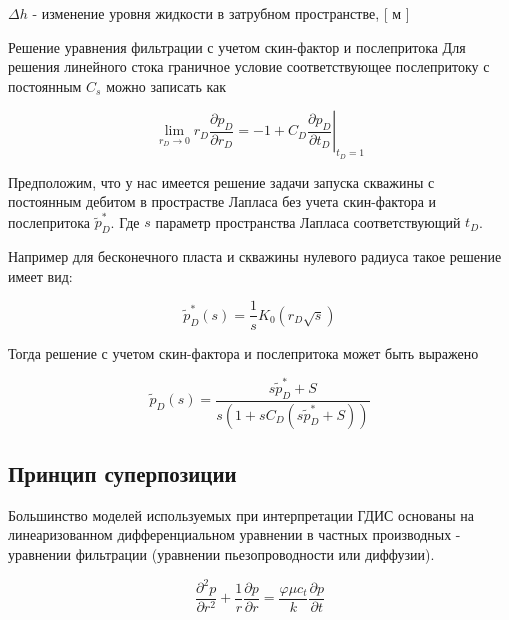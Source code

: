 $ {\Delta h}$ - изменение уровня жидкости в затрубном пространстве, [ м ]

Решение уравнения фильтрации с учетом скин-фактор и послепритока
Для решения линейного стока граничное условие соответствующее послепритоку с постоянным $C_s$ можно записать как

$$ \lim_{r_D \to 0} {r_D \frac{\partial p_D}{\partial r_D}} = -1 + \left. C_D \frac{\partial p_D}{\partial t_D} \right|_{t_D=1}$$

Предположим, что у нас имеется решение задачи запуска скважины с постоянным дебитом в прострастве Лапласа без учета скин-фактора и послепритока $\tilde{p}_D^{*}$. Где $s$ параметр пространства Лапласа соответствующий $t_D$.

Например для бесконечного пласта и скважины нулевого радиуса такое решение имеет вид: 

$$\tilde{p}_D^*(s) = \frac{1}{s} K_0 \left( r_D \sqrt s  \right) $$

Тогда решение с учетом скин-фактора и послепритока может быть выражено 

$$\tilde{p}_D(s) = \frac{s \tilde{p}_D^* + S}{s \left( 1+s C_D \left( s \tilde{p}_D^* + S \right)  \right)}   $$



%
%
%
%

\subsection{Принцип суперпозиции}

Большинство моделей используемых при интерпретации ГДИС основаны на линеаризованном дифференциальном уравнении в частных производных - уравнении фильтрации (уравнении пьезопроводности или диффузии).

$$ \frac{\partial ^2 p }{\partial r^2} + \frac{1}{r} \frac{\partial p}{\partial r} = \frac{\varphi \mu c_t}{k} \frac{\partial p}{\partial t} $$

